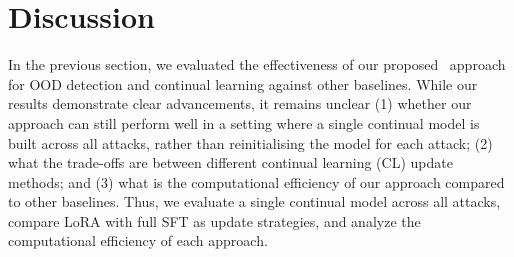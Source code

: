 \section{Discussion}
\label{sec:discussion}
In the previous section, we evaluated the effectiveness of our proposed \ourapp~approach for OOD detection and continual learning against other baselines.
While our results demonstrate clear advancements, it remains unclear (1) whether our approach can still perform well in a setting where a single continual model is built across all attacks, rather than reinitialising the model for each attack; (2) what the trade-offs are between different continual learning (CL) update methods; and (3) what is the computational efficiency of our approach compared to other baselines. Thus, we evaluate a single continual model across all attacks, compare LoRA with full SFT as update strategies, and analyze the computational efficiency of each approach.

\begin{table}[h]
\centering
\caption{(Discussion) DSR of \ourapp~under Sequential Continual Learning with and without Early Stopping across 10 OOD Attack Types.}
\label{tab:lora_dsr_results}
\end{table}

